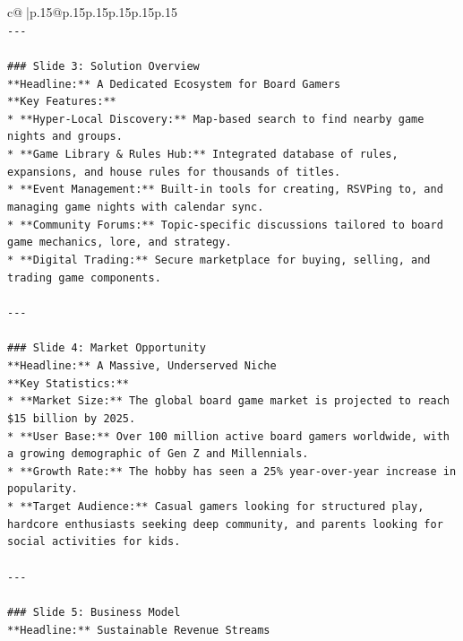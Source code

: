 \documentclass{article}
\begin{document}
{\begin{supertabular}{c@{$\;$}|p{.15\linewidth}@{}p{.15\linewidth}p{.15\linewidth}p{.15\linewidth}p{.15\linewidth}p{.15\linewidth}}
{{{\\ 
\texttt{{-}{-}{-}} \\
\\ 
\texttt{\#\#\# Slide 3: Solution Overview} \\
\texttt{**Headline:** A Dedicated Ecosystem for Board Gamers} \\
\texttt{**Key Features:**} \\
\texttt{*   **Hyper{-}Local Discovery:** Map{-}based search to find nearby game nights and groups.} \\
\texttt{*   **Game Library \& Rules Hub:** Integrated database of rules, expansions, and house rules for thousands of titles.} \\
\texttt{*   **Event Management:** Built{-}in tools for creating, RSVPing to, and managing game nights with calendar sync.} \\
\texttt{*   **Community Forums:** Topic{-}specific discussions tailored to board game mechanics, lore, and strategy.} \\
\texttt{*   **Digital Trading:** Secure marketplace for buying, selling, and trading game components.} \\
\\ 
\texttt{{-}{-}{-}} \\
\\ 
\texttt{\#\#\# Slide 4: Market Opportunity} \\
\texttt{**Headline:** A Massive, Underserved Niche} \\
\texttt{**Key Statistics:**} \\
\texttt{*   **Market Size:** The global board game market is projected to reach \$15 billion by 2025.} \\
\texttt{*   **User Base:** Over 100 million active board gamers worldwide, with a growing demographic of Gen Z and Millennials.} \\
\texttt{*   **Growth Rate:** The hobby has seen a 25\% year{-}over{-}year increase in popularity.} \\
\texttt{*   **Target Audience:** Casual gamers looking for structured play, hardcore enthusiasts seeking deep community, and parents looking for social activities for kids.} \\
\\ 
\texttt{{-}{-}{-}} \\
\\ 
\texttt{\#\#\# Slide 5: Business Model} \\
\texttt{**Headline:** Sustainable Revenue Streams} \\
}}}
\end{supertabular}}
\end{document}
